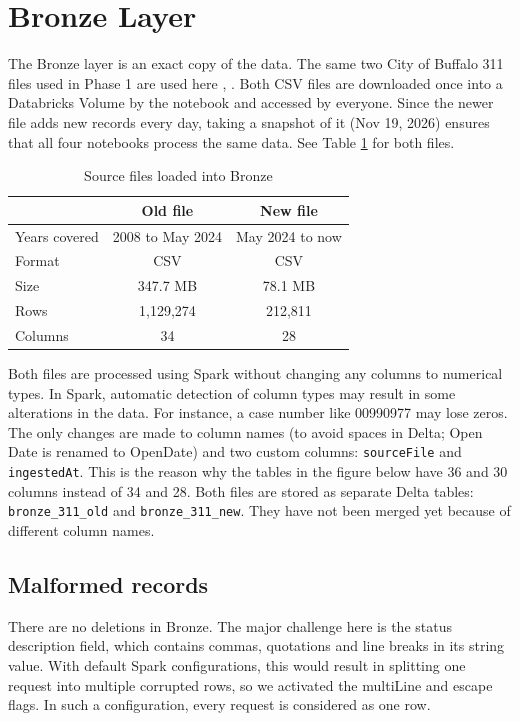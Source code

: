 \documentclass[conference]{IEEEtran}
\begin{document}
\raggedbottom

\section{Bronze Layer}
The Bronze layer is an exact copy of the data. The same two City of Buffalo 311 files used in Phase 1 are used here \cite{data1}, \cite{data2}. Both CSV files are downloaded once into a Databricks Volume by the notebook and accessed by everyone. Since the newer file adds new records every day, taking a snapshot of it (Nov 19, 2026) ensures that all four notebooks process the same data. See Table \ref{tab:source} for both files.

\begin{table}[h]
\centering
\caption{Source files loaded into Bronze}
\label{tab:source}
\begin{tabular}{lcc}
\toprule
 & Old file & New file \\
\midrule
Years covered & 2008 to May 2024 & May 2024 to now \\
Format & CSV & CSV \\
Size & 347.7 MB & 78.1 MB \\
Rows & 1,129,274 & 212,811 \\
Columns & 34 & 28 \\
\bottomrule
\end{tabular}
\end{table}

Both files are processed using Spark without changing any columns to numerical types. In Spark, automatic detection of column types may result in some alterations in the data. For instance, a case number like 00990977 may lose zeros. The only changes are made to column names (to avoid spaces in Delta; Open Date is renamed to OpenDate) and two custom columns: \texttt{sourceFile} and \texttt{ingestedAt}. This is the reason why the tables in the figure below have 36 and 30 columns instead of 34 and 28. Both files are stored as separate Delta tables: \texttt{bronze\_311\_old} and \texttt{bronze\_311\_new}. They have not been merged yet because of different column names.

\subsection{Malformed records}
There are no deletions in Bronze. The major challenge here is the status description field, which contains commas, quotations and line breaks in its string value. With default Spark configurations, this would result in splitting one request into multiple corrupted rows, so we activated the multiLine and escape flags. In such a configuration, every request is considered as one row.
\end{document}
